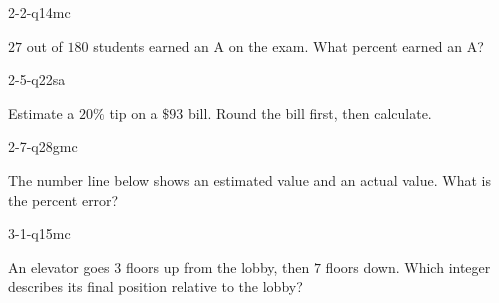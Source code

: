 \begin{practiceQuestion}{2-2-q14}{mc}
\begin{questionText}
$27$ out of $180$ students earned an A on the exam. What percent earned an A?
\end{questionText}
\end{practiceQuestion}

\begin{practiceQuestion}{2-5-q22}{sa}
\begin{questionText}
Estimate a $20\%$ tip on a $\$93$ bill. Round the bill first, then calculate.
\end{questionText}
\end{practiceQuestion}

\begin{practiceQuestion}{2-7-q28}{gmc}
\begin{questionText}
The number line below shows an estimated value and an actual value. What is the percent error?

\begin{center}
\end{center}
\end{questionText}
\end{practiceQuestion}

\begin{practiceQuestion}{3-1-q15}{mc}
\begin{questionText}
An elevator goes $3$ floors up from the lobby, then $7$ floors down. Which integer describes its final position relative to the lobby?
\end{questionText}
\end{practiceQuestion}

